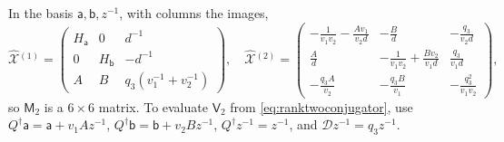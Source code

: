 \documentclass[11pt]{amsart}
\theoremstyle{definition}
\theoremstyle{remark}
\newcommand{\DD}{\mathcal D}
\newcommand{\Xhat}[1]{\widehat{\mathcal X}{}^{(#1)}}   %
\newcommand{\MM}{\mathsf M}
\newcommand{\Miura}[1]{\MM_{#1}}                 %
\newcommand{\VV}{\mathsf V}
\newcommand{\Vconj}[1]{\VV_{#1}}                 %
\newcommand{\Qan}{Q^\dagger}                     %
\begin{document}
In the basis \(\mathsf a,\mathsf b,z^{-1}\), with columns the images,
\[
 \Xhat{1}=\begin{pmatrix}H_{\mathsf a}&0&d^{-1}\\[2pt]0&H_{\mathsf b}&-d^{-1}\\[2pt]A&B&q_3(v_1^{-1}+v_2^{-1})\end{pmatrix},\quad
 \Xhat{2}=\begin{pmatrix}
 -\frac{1}{v_1v_2}-\frac{Av_1}{v_2d}&-\frac{B}{d}&-\frac{q_3}{v_2d}\\[3pt]
 \frac{A}{d}&-\frac{1}{v_1v_2}+\frac{Bv_2}{v_1d}&\frac{q_3}{v_1d}\\[3pt]
 -\frac{q_3A}{v_2}&-\frac{q_3B}{v_1}&-\frac{q_3^2}{v_1v_2}\end{pmatrix},
\]
so \(\Miura{2}\) is a \(6\times6\) matrix.
To evaluate \(\Vconj{2}\) from \eqref{eq:ranktwoconjugator}, use
\(\Qan\mathsf a=\mathsf a+v_1Az^{-1}\), \(\Qan\mathsf b=\mathsf b+v_2Bz^{-1}\),
\(\Qan z^{-1}=z^{-1}\), and \(\DD z^{-1}=q_3z^{-1}\).
\end{document}
